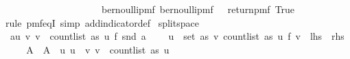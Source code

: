 \begin{isabellebody}
\ \ \ \ \ \ \ \ {\isacharparenright}{\kern0pt}\isanewline
\ \ \ \ \ \ {\isacharparenright}{\kern0pt}\isanewline
\ \ \ \ {\isacharbraceright}{\kern0pt}{\isachardoublequoteclose}\isanewline
\isanewline
{}\isamarkupfalse%
\ bernoulli{\isacharunderscore}{\kern0pt}pmf{\isacharunderscore}{\kern0pt}{}{\isacharcolon}{\kern0pt}\ {\isachardoublequoteopen}bernoulli{\isacharunderscore}{\kern0pt}pmf\ {}\ {\isacharequal}{\kern0pt}\ return{\isacharunderscore}{\kern0pt}pmf\ True{\isachardoublequoteclose}\isanewline
%
\isadelimproof
\ \ \ \ %
\endisadelimproof
%
\isatagproof
{}\isamarkupfalse%
\ {\isacharparenleft}{\kern0pt}rule\ pmf{\isacharunderscore}{\kern0pt}eqI{\isacharcomma}{\kern0pt}\ simp\ add{\isacharcolon}{\kern0pt}indicator{\isacharunderscore}{\kern0pt}def{\isacharparenright}{\kern0pt}%
\endisatagproof
{\isafoldproof}%
%
\isadelimproof
\isanewline
%
\endisadelimproof
\isanewline
{}\isamarkupfalse%
\ split{\isacharunderscore}{\kern0pt}space{\isacharcolon}{\kern0pt}\isanewline
\ \ {\isachardoublequoteopen}{\isacharparenleft}{\kern0pt}{\isasymSum}a{\isasymin}{\isacharbraceleft}{\kern0pt}{\isacharparenleft}{\kern0pt}u{\isacharcomma}{\kern0pt}\ v{\isacharparenright}{\kern0pt}{\isachardot}{\kern0pt}\ v\ {\isacharless}{\kern0pt}\ count{\isacharunderscore}{\kern0pt}list\ as\ u{\isacharbraceright}{\kern0pt}{\isachardot}{\kern0pt}\ {\isacharparenleft}{\kern0pt}f\ {\isacharparenleft}{\kern0pt}snd\ a{\isacharparenright}{\kern0pt}{\isacharparenright}{\kern0pt}{\isacharparenright}{\kern0pt}\ {\isacharequal}{\kern0pt}\ \isanewline
\ \ {\isacharparenleft}{\kern0pt}{\isasymSum}u\ {\isasymin}\ set\ as{\isachardot}{\kern0pt}\ {\isacharparenleft}{\kern0pt}{\isasymSum}v\ {\isasymin}{\isacharbraceleft}{\kern0pt}{}{\isachardot}{\kern0pt}{\isachardot}{\kern0pt}{\isacharless}{\kern0pt}count{\isacharunderscore}{\kern0pt}list\ as\ u{\isacharbraceright}{\kern0pt}{\isachardot}{\kern0pt}\ {\isacharparenleft}{\kern0pt}f\ v{\isacharparenright}{\kern0pt}{\isacharparenright}{\kern0pt}{\isacharparenright}{\kern0pt}{\isachardoublequoteclose}\ {\isacharparenleft}{\kern0pt}\ {\isachardoublequoteopen}{\isacharquery}{\kern0pt}lhs\ {\isacharequal}{\kern0pt}\ {\isacharquery}{\kern0pt}rhs{\isachardoublequoteclose}{\isacharparenright}{\kern0pt}\isanewline
%
\isadelimproof
%
\endisadelimproof
%
\isatagproof
{}\isamarkupfalse%
\ {\isacharminus}{\kern0pt}\isanewline
\ \ \isamarkupfalse%
\ A\ \ {\isachardoublequoteopen}A\ {\isacharequal}{\kern0pt}\ {\isacharparenleft}{\kern0pt}{\isasymlambda}u{\isachardot}{\kern0pt}\ {\isacharbraceleft}{\kern0pt}u{\isacharbraceright}{\kern0pt}\ {\isasymtimes}\ {\isacharbraceleft}{\kern0pt}v{\isachardot}{\kern0pt}\ v\ {\isacharless}{\kern0pt}\ count{\isacharunderscore}{\kern0pt}list\ as\ u{\isacharbraceright}{\kern0pt}{\isacharparenright}{\kern0pt}{\isachardoublequoteclose}\isanewline

\end{isabellebody}
